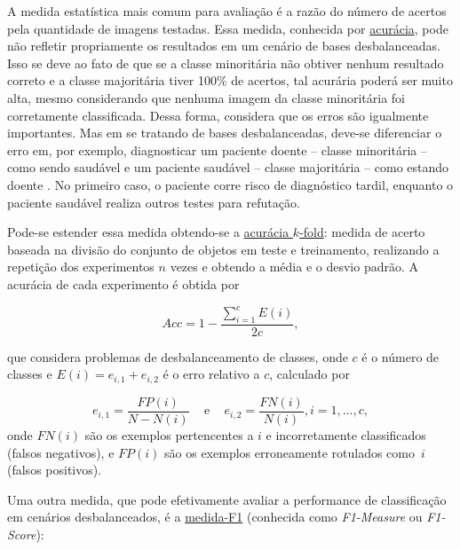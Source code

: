 
A medida estatística mais comum para avaliação é a razão do número de acertos pela quantidade de imagens testadas. Essa medida, conhecida por \underline{acurácia}, pode não refletir propriamente os resultados em um cenário de bases desbalanceadas. Isso se deve ao fato de que se a classe minoritária não obtiver nenhum resultado correto e a classe majoritária tiver 100\% de acertos, tal acurária poderá ser muito alta, mesmo considerando que nenhuma imagem da classe minoritária foi corretamente classificada. Dessa forma, considera que os erros são igualmente importantes. Mas em se tratando de bases desbalanceadas, deve-se diferenciar o erro em, por exemplo, diagnosticar um paciente doente -- classe minoritária -- como sendo saudável e um paciente saudável -- classe majoritária -- como estando doente \cite{Batista2004}. No primeiro caso, o paciente corre risco de diagnóstico tardil, enquanto o paciente saudável realiza outros testes para refutação.

Pode-se estender essa medida obtendo-se a \underline{acurácia $k$-fold}: medida de acerto baseada na divisão do conjunto de objetos em teste e treinamento, realizando a repetição dos experimentos $n$ vezes e obtendo a média e o desvio padrão. A acurácia de cada experimento é obtida por

    \begin{equation*}
      Acc = 1 - \frac{\sum_{i=1}^{c} E(i)}{2c},
    \label{eq:Accuracy}
    \end{equation*}

    \noindent  que considera problemas de desbalanceamento de classes, onde $c$ é o número de classes e $E(i) = e_{i,1} + e_{i,2}$ é o erro relativo a $c$, calculado por

    \begin{equation*}
      e_{i,1} = \frac{FP(i)}{N-N(i)} \,\,\,\,\, \text{ e } \,\,\,\,\, e_{i,2} = \frac{FN(i)}{N(i)}, i=1,...,c,
    \label{eq:Errors}
    \end{equation*}
   \noindent onde $FN(i)$ são os exemplos pertencentes a $i$ e incorretamente classificados (falsos negativos), e $FP(i)$ são os exemplos erroneamente rotulados como~$i$ (falsos positivos).


Uma outra medida, que pode efetivamente avaliar a performance de classificação em cenários desbalanceados, é a \underline{medida-F1} (conhecida como \textit{F1-Measure} ou \textit{F1-Score}):

